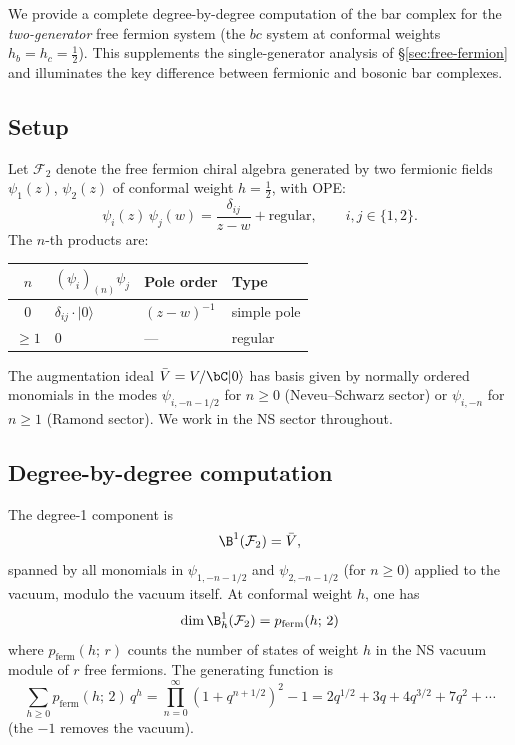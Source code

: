 We provide a complete degree-by-degree computation of the bar complex
for the \emph{two-generator} free fermion system (the $bc$ system
at conformal weights $h_b = h_c = \tfrac{1}{2}$).
This supplements the single-generator analysis of
\S\ref{sec:free-fermion} and illuminates the key difference between
fermionic and bosonic bar complexes.

\subsection{Setup}

\begin{computation}
\label{comp:fermion-two-gen-ope}
Let $\mathcal{F}_2$ denote the free fermion chiral algebra generated
by two fermionic fields $\psi_1(z)$, $\psi_2(z)$ of conformal
weight $h = \tfrac{1}{2}$, with OPE:
\begin{equation}\label{eq:fermion-two-gen-ope}
\psi_i(z)\,\psi_j(w) = \frac{\delta_{ij}}{z - w} + \text{regular},
\qquad i, j \in \{1, 2\}.
\end{equation}
The $n$-th products are:
\begin{center}
\renewcommand{\arraystretch}{1.15}
\begin{tabular}{clll}
$n$ & $(\psi_i)_{(n)}\psi_j$ & Pole order & Type \\
\hline
$0$ & $\delta_{ij}\cdot |0\rangle$ & $(z-w)^{-1}$ & simple pole \\
$\geq 1$ & $0$ & --- & regular
\end{tabular}
\end{center}
The augmentation ideal $\bar{V} = V/\bC|0\rangle$ has basis given by
normally ordered monomials in the modes
$\psi_{i,-n-1/2}$ for $n \geq 0$ (Neveu--Schwarz sector) or
$\psi_{i,-n}$ for $n \geq 1$ (Ramond sector).
We work in the NS sector throughout.
\end{computation}

\subsection{Degree-by-degree computation}

\begin{computation}[Degree 1]
\label{comp:fermion-deg1}
The degree-1 component is
\[
\B^1(\mathcal{F}_2) = \bar{V},
\]
spanned by all monomials in $\psi_{1,-n-1/2}$ and $\psi_{2,-n-1/2}$
(for $n \geq 0$) applied to the vacuum, modulo the vacuum itself.
At conformal weight $h$, one has
\[
\dim \B^1_h(\mathcal{F}_2) = p_{\mathrm{ferm}}(h;\,2)
\]
where $p_{\mathrm{ferm}}(h;\,r)$ counts the number of states of weight $h$
in the NS vacuum module of $r$ free fermions.  The generating function is
\begin{equation}\label{eq:fermion-char}
\sum_{h \geq 0} p_{\mathrm{ferm}}(h;\,2)\,q^h
= \prod_{n=0}^{\infty}(1 + q^{n+1/2})^2 - 1
= 2q^{1/2} + 3q + 4q^{3/2} + 7q^2 + \cdots
\end{equation}
(the $-1$ removes the vacuum).
\end{computation}

